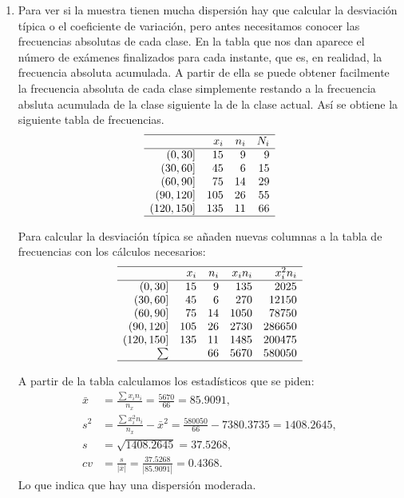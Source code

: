 {\begin{enumerate}
\item Para ver si la muestra tienen mucha dispersión hay que calcular la desviación típica o el coeficiente de variación, pero antes necesitamos
conocer las frecuencias absolutas de cada clase. En la tabla que nos dan aparece el número de exámenes finalizados para cada instante, que es,
en realidad, la frecuencia absoluta acumulada. A partir de ella se puede obtener facilmente la frecuencia absoluta de cada clase simplemente
restando a la frecuencia absluta acumulada de la clase siguiente la de la clase actual. Así se obtiene la siguiente tabla de frecuencias. 
\[
\begin{array}{rrrr}
  \hline
 & x_i & n_i & N_i \\ 
  \hline
(0,30] & 15 & 9 & 9 \\ 
  (30,60] & 45 & 6 & 15 \\ 
  (60,90] & 75 & 14 & 29 \\ 
  (90,120] & 105 & 26 & 55 \\ 
  (120,150] & 135 & 11 & 66 \\ 
   \hline
\end{array}\]

Para calcular la desviación típica se añaden nuevas columnas a la tabla de frecuencias con los cálculos necesarios:
\[
\begin{array}{rrrrr}
  \hline
 & x_i & n_i & x_in_i & x_i^2n_i \\ 
  \hline
(0,30] & 15 & 9 & 135 & 2025 \\ 
  (30,60] & 45 & 6 & 270 & 12150 \\ 
  (60,90] & 75 & 14 & 1050 & 78750 \\ 
  (90,120] & 105 & 26 & 2730 & 286650 \\ 
  (120,150] & 135 & 11 & 1485 & 200475 \\ 
  \sum &  & 66 & 5670 & 580050 \\ 
   \hline
\end{array}\]

A partir de la tabla calculamos los estadísticos que se piden:
\begin{align*}
\bar x &= \frac{\sum x_in_i}{n_x} = \frac{5670}{66} = 85.9091,\\
s^2 & = \frac{\sum x_i^2n_i}{n_x}-\bar x^2 = \frac{580050}{66}-7380.3735 = 1408.2645,\\
s & = \sqrt{1408.2645} = 37.5268,\\
cv & = \frac{s}{|\bar x|} = \frac{37.5268}{|85.9091|} = 0.4368.
\end{align*}
Lo que indica que hay una dispersión moderada. 


\end{enumerate}}
